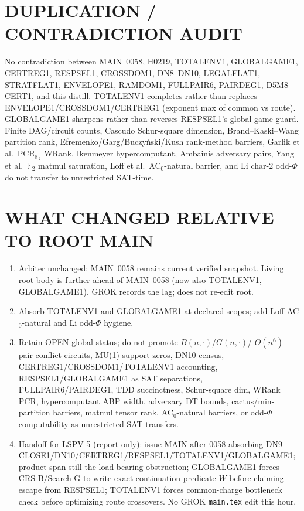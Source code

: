 \documentclass[11pt]{article}
\begin{document}
\section*{DUPLICATION / CONTRADICTION AUDIT}
No contradiction between MAIN~0058, H0219, TOTALENV1, GLOBALGAME1, CERTREG1,
RESPSEL1, CROSSDOM1, DN8--DN10, LEGALFLAT1, STRATFLAT1, ENVELOPE1, RAMDOM1,
FULLPAIR6, PAIRDEG1, D5M8-CERT1, and this distill. TOTALENV1 completes rather
than replaces ENVELOPE1/CROSSDOM1/CERTREG1 (exponent max of common vs route).
GLOBALGAME1 sharpens rather than reverses RESPSEL1's global-game guard.
Finite DAG/circuit counts, Cascudo Schur-square dimension, Brand--Kaski--Wang
partition rank, Efremenko/Garg/Buczy\'nski/Kush rank-method barriers, Garlik
et al.\ PCR$_{\mathbb F_2}$ WRank, Ikenmeyer hypercomputant, Ambainis
adversary pairs, Yang et al.\ $\mathbb F_2$ matmul saturation, Loff et al.\
AC$_0$-natural barrier, and Li char-$2$ odd-$\Phi$ do not transfer to
unrestricted SAT-time.

\section*{WHAT CHANGED RELATIVE TO ROOT MAIN}
\begin{enumerate}
\item Arbiter unchanged: MAIN~0058 remains current verified snapshot. Living
root body is further ahead of MAIN~0058 (now also TOTALENV1, GLOBALGAME1).
GROK records the lag; does not re-edit root.
\item Absorb TOTALENV1 and GLOBALGAME1 at declared scopes; add Loff
AC$_0$-natural and Li odd-$\Phi$ hygiene.
\item Retain OPEN global status; do not promote $B(n,\cdot)$/$G(n,\cdot)$/
$O(n^6)$ pair-conflict circuits, MU(1) support zeros, DN10 census,
CERTREG1/CROSSDOM1/TOTALENV1 accounting, RESPSEL1/GLOBALGAME1 as SAT
separations, FULLPAIR6/PAIRDEG1, TDD succinctness, Schur-square dim, WRank
PCR, hypercomputant ABP width, adversary DT bounds, cactus/min-partition
barriers, matmul tensor rank, AC$_0$-natural barriers, or odd-$\Phi$
computability as unrestricted SAT transfers.
\item Handoff for LSPV-5 (report-only): issue MAIN after 0058 absorbing
DN9-CLOSE1/DN10/CERTREG1/RESPSEL1/TOTALENV1/GLOBALGAME1; product-span still
the load-bearing obstruction; GLOBALGAME1 forces CRS-B/Search-G to write exact
continuation predicate $W$ before claiming escape from RESPSEL1; TOTALENV1
forces common-charge bottleneck check before optimizing route crossovers.
No GROK \texttt{main.tex} edit this hour.
\end{enumerate}
\end{document}
